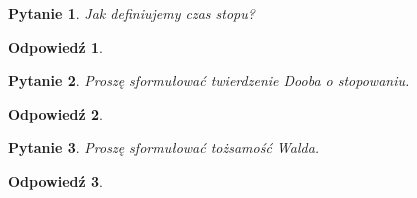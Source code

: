 \documentclass[12pt]{mwart}
\theoremstyle{plain}
\newtheorem{pytanie}{Pytanie}
\theoremstyle{break}
\newtheorem*{odpowiedź}{Odpowiedź}
\begin{document}
\begin{pytanie}
Jak definiujemy czas stopu?
\end{pytanie}
\begin{odpowiedź}
\end{odpowiedź}


\begin{pytanie}
Proszę sformułować twierdzenie Dooba o stopowaniu.
\end{pytanie}
\begin{odpowiedź}
\end{odpowiedź}


\begin{pytanie}
Proszę sformułować tożsamość Walda.
\end{pytanie}
\begin{odpowiedź}
\end{odpowiedź}
\end{document}
